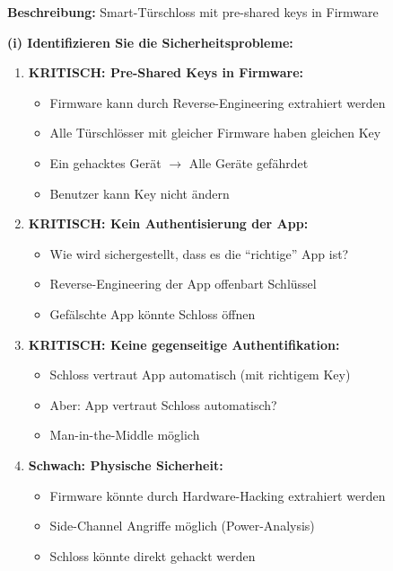 \documentclass[12pt,a4paper]{article}
\begin{document}
\begin{tcolorbox}[colback=solutionbg, colframe=black!30]

\textbf{Beschreibung:} Smart-Türschloss mit pre-shared keys in Firmware

\textbf{(i) Identifizieren Sie die Sicherheitsprobleme:} \checkmark

\begin{enumerate}[1.]
    \item \textbf{KRITISCH: Pre-Shared Keys in Firmware:}
    \begin{itemize}
        \item Firmware kann durch Reverse-Engineering extrahiert werden
        \item Alle Türschlösser mit gleicher Firmware haben gleichen Key
        \item Ein gehacktes Gerät $\to$ Alle Geräte gefährdet
        \item Benutzer kann Key nicht ändern
    \end{itemize}
    
    \item \textbf{KRITISCH: Kein Authentisierung der App:}
    \begin{itemize}
        \item Wie wird sichergestellt, dass es die ``richtige'' App ist?
        \item Reverse-Engineering der App offenbart Schlüssel
        \item Gefälschte App könnte Schloss öffnen
    \end{itemize}
    
    \item \textbf{KRITISCH: Keine gegenseitige Authentifikation:}
    \begin{itemize}
        \item Schloss vertraut App automatisch (mit richtigem Key)
        \item Aber: App vertraut Schloss automatisch?
        \item Man-in-the-Middle möglich
    \end{itemize}
    
    \item \textbf{Schwach: Physische Sicherheit:}
    \begin{itemize}
        \item Firmware könnte durch Hardware-Hacking extrahiert werden
        \item Side-Channel Angriffe möglich (Power-Analysis)
        \item Schloss könnte direkt gehackt werden
    \end{itemize}
    

\end{enumerate}
\end{tcolorbox}
\end{document}
